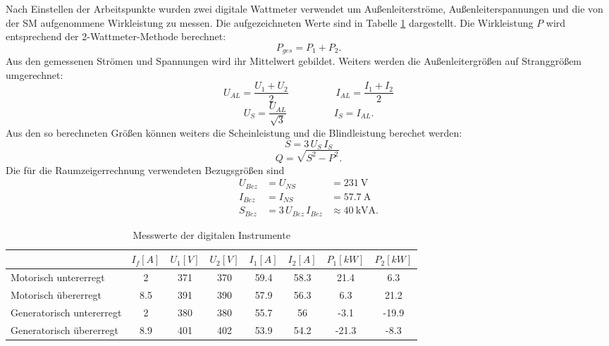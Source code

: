 \noindent Nach Einstellen der Arbeitspunkte wurden zwei digitale Wattmeter verwendet um Außenleiterströme, Außenleiterspannungen und die von der SM aufgenommene Wirkleistung zu messen. Die aufgezeichneten Werte sind in Tabelle \ref{tab:betrzustaende_digitale_messungen} dargestellt. Die Wirkleistung $P$ wird entsprechend der 2-Wattmeter-Methode berechnet:
\begin{equation*}
    P_{ges}=P_1+P_2.
\end{equation*}
Aus den gemessenen Strömen und Spannungen wird ihr Mittelwert gebildet. Weiters werden die Außenleitergrößen auf Stranggrößem umgerechnet:
\begin{equation*}
    U_{AL}=\frac{U_1+U_2}{2}\hspace{2cm}
    I_{AL}=\frac{I_1+I_2}{2}
\end{equation*}
\begin{equation*}
    U_{S}=\frac{U_{AL}}{\sqrt{3}}\hspace{2cm}
    I_{S}=I_{AL}.
\end{equation*}
Aus den so berechneten Größen können weiters die Scheinleistung und die Blindleistung berechet werden:
\begin{equation*}
    S=3\,U_S\,I_S
\end{equation*}
\begin{equation*}
    Q=\sqrt{S^2-P^2}.
\end{equation*}
Die für die Raumzeigerrechnung verwendeten Bezugsgrößen sind 
\begin{align*}
    U_{Bez} &= U_{NS} &= \SI{231}{\volt}\\
    I_{Bez} &= I_{NS} &= \SI{57.7}{\ampere}\\
    S_{Bez} &= 3\,U_{Bez}\,I_{Bez} &\approx \SI{40}{\kilo\volt\ampere}.
\end{align*}
\begin{table}[!ht]
\centering
\begin{tabular}{|l|c|c|c|c|c|c|c|}
\hline
                          & $I_f [A]$ & $U_1 [V]$ & $U_2 [V]$ & $I_1 [A]$ & $I_2 [A]$ & $P_1 [kW]$ & $P_2 [kW]$ \\ \hline
Motorisch untererregt     & 2         & 371       & 370       & 59.4      & 58.3      & 21.4       & 6.3        \\ \hline
Motorisch übererregt      & 8.5       & 391       & 390       & 57.9      & 56.3      & 6.3        & 21.2       \\ \hline
Generatorisch untererregt & 2         & 380       & 380       & 55.7      & 56        & -3.1       & -19.9      \\ \hline
Generatorisch übererregt  & 8.9       & 401       & 402       & 53.9      & 54.2      & -21.3      & -8.3       \\ \hline
\end{tabular}
\caption{Messwerte der digitalen Instrumente}
\label{tab:betrzustaende_digitale_messungen}
\end{table}


